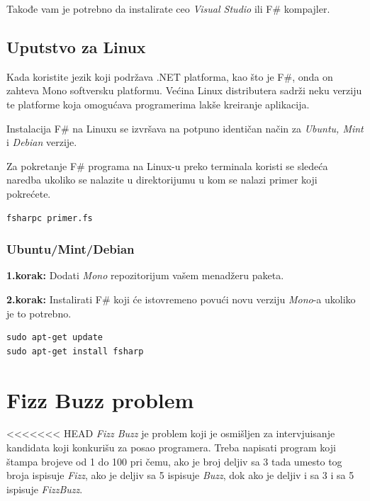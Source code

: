 \documentclass[a4paper]{article}
\begin{document}
Takođe vam je potrebno da instalirate ceo {\em Visual Studio} ili F\# kompajler.


\subsection{Uputstvo za Linux}

Kada koristite jezik koji podržava .NET platforma, kao što je F\#, onda on zahteva Mono \cite{mono} softversku platformu. Većina Linux distributera sadrži neku verziju te platforme koja omogućava programerima lakše kreiranje aplikacija. 

Instalacija F\# na Linuxu se izvršava na potpuno identičan način za {\em Ubuntu, Mint} i {\em Debian} verzije.

Za pokretanje F\# programa na Linux-u preko terminala koristi se sledeća naredba ukoliko se nalazite u direktorijumu u kom se nalazi primer koji pokrećete.
\\
\begin{lstlisting}
fsharpc primer.fs
\end{lstlisting}

\subsubsection{Ubuntu/Mint/Debian}

\textbf{1.korak:} Dodati {\em Mono} \cite{mono} repozitorijum vašem menadžeru paketa.

\textbf{2.korak:} Instalirati F\# koji će istovremeno povući novu verziju {\em Mono}-a ukoliko je to potrebno.
\\
\begin{lstlisting}
sudo apt-get update
sudo apt-get install fsharp
\end{lstlisting}
 
\section{Fizz Buzz problem}
<<<<<<< HEAD
\textit{Fizz Buzz} je problem koji je osmišljen za intervjuisanje kandidata koji konkurišu za posao programera. Treba napisati program koji štampa brojeve od 1 do 100 pri čemu, ako je broj deljiv sa 3 tada umesto tog broja ispisuje \textit{Fizz}, ako je deljiv sa 5 ispisuje \textit{Buzz}, dok ako je deljiv i sa 3 i sa 5 ispisuje \textit{FizzBuzz}. \\
\end{document}
